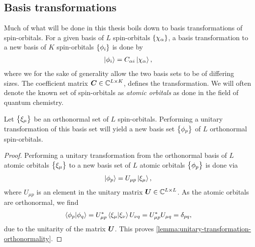         \subsection{Basis transformations}
            \label{subsec:basis-transformation}
            Much of what will be done in this thesis boils down to basis
            transformations of spin-orbitals.
            For a given basis of $L$ spin-orbitals $\left\{ \chi_{\alpha} \right\}$, a
            basis transformation to a new basis of $K$ spin-orbitals
            $\left\{ \phi_{i} \right\}$ is done by
            \begin{align}
                \ket*{\phi_{i}}
                = C_{\alpha i}\ket*{\chi_{\alpha}},
            \end{align}
            where we for the sake of generality allow the two basis sets to be
            of differing sizes.
            The coefficient matrix $\boldsymbol{C} \in \mathbb{C}^{L \times K}$,
            defines the transformation.
            We will often denote the known set of spin-orbitals as \emph{atomic
            orbitals} as done in the field of quantum chemistry.
            \begin{lemma}
                \label{lemma:unitary-transformation-orthonormality}
                Let $\left\{ \xi_{\mu} \right\}$ be an orthonormal set of $L$
                spin-orbitals.
                Performing a unitary transformation of this basis set will yield
                a new basis set $\left\{ \phi_{p} \right\}$ of $L$ orthonormal
                spin-orbitals.
            \end{lemma}
            \begin{proof}
                Performing a unitary transformation from the orthonormal basis
                of $L$ atomic orbitals $\left\{ \xi_{\mu} \right\}$ to a new basis set of
                $L$ atomic orbitals $\left\{ \phi_p \right\}$ is done via
                \begin{align}
                    \ket*{\phi_p} = U_{\mu p}\ket*{\xi_{\mu}},
                \end{align}
                where $U_{\mu p}$ is an element in the unitary matrix $\boldsymbol{U}
                \in \mathbb{C}^{L \times L}$.
                As the atomic orbitals are orthonormal, we find
                \begin{align}
                    \braket*{\phi_{p}}{\phi_{q}}
                    =
                    U^{*}_{\mu p} \braket*{\xi_{\mu}}{\xi_{\nu}}
                    U_{\nu q}
                    = U^{*}_{\mu p} U_{\mu q}
                    = \delta_{pq},
                \end{align}
                due to the unitarity of the matrix $\boldsymbol{U}$.
                This proves
                \autoref{lemma:unitary-transformation-orthonormality}.
            \end{proof}


